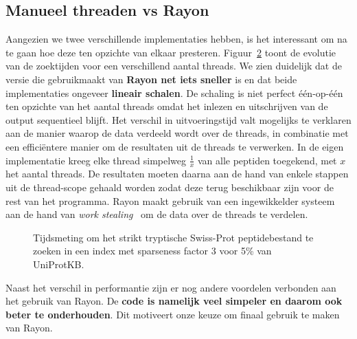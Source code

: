 \subsection{Manueel threaden vs Rayon}\label{subsec:manueel-threaden-vs-rayon}
Aangezien we twee verschillende implementaties hebben, is het interessant om na te gaan hoe deze ten opzichte van elkaar presteren.
Figuur~\ref{fig:threading_default_vs_rayon} toont de evolutie van de zoektijden voor een verschillend aantal threads.
We zien duidelijk dat de versie die gebruikmaakt van \textbf{Rayon net iets sneller} is en dat beide implementaties ongeveer \textbf{lineair schalen}.
De schaling is niet perfect één-op-één ten opzichte van het aantal threads omdat het inlezen en uitschrijven van de output sequentieel blijft.
Het verschil in uitvoeringstijd valt mogelijks te verklaren aan de manier waarop de data verdeeld wordt over de threads, in combinatie met een efficiëntere manier om de resultaten uit de threads te verwerken.
In de eigen implementatie kreeg elke thread simpelweg $\frac{1}{x}$ van alle peptiden toegekend, met $x$ het aantal threads.
De resultaten moeten daarna aan de hand van enkele stappen uit de thread-scope gehaald worden zodat deze terug beschikbaar zijn voor de rest van het programma.
Rayon maakt gebruik van een ingewikkelder systeem aan de hand van \textit{work stealing}~\cite{rayon_stealing} om de data over de threads te verdelen.



\begin{figure}[H]
    \centering
    \label{fig:threading_default_vs_rayon_1}
\end{figure}
\begin{figure}[H]\ContinuedFloat
    \centering
    \caption{Tijdsmeting om het strikt tryptische Swiss-Prot peptidebestand te zoeken in een index met sparseness factor 3 voor 5\% van UniProtKB.}\label{fig:threading_default_vs_rayon}
\end{figure}

Naast het verschil in performantie zijn er nog andere voordelen verbonden aan het gebruik van Rayon.
De \textbf{code is namelijk veel simpeler en daarom ook beter te onderhouden}.
Dit motiveert onze keuze om finaal gebruik te maken van Rayon.


